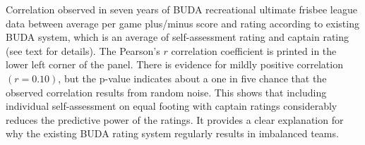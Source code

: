 Correlation observed in seven years of BUDA recreational ultimate frisbee league data between average per game plus/minus score and rating according to existing BUDA system, which is an average of self-assessment rating and captain rating (see text for details). The Pearson's $r$ correlation coefficient is printed in the lower left corner of the panel. There is evidence for mildly positive correlation $(r = 0.10)$, but the p-value indicates about a one in five chance that the observed correlation results from random noise.  This shows that including individual self-assessment on equal footing with captain ratings considerably reduces the predictive power of the ratings. It provides a clear explanation for why the existing BUDA rating system regularly results in imbalanced teams. \label{fig:correlation_buda}